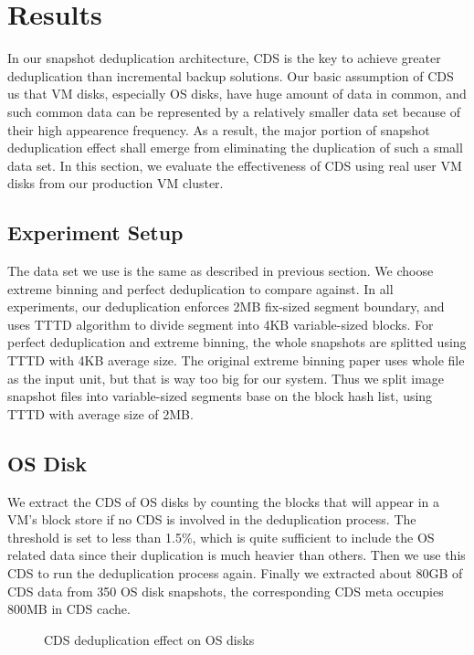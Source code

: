 \section{Results}
In our snapshot deduplication architecture, CDS is the key to achieve greater deduplication than
incremental backup solutions. Our basic assumption of CDS us that VM disks, especially OS disks,
have huge amount of data in common, and such common data can be represented by a relatively smaller data set
because of their high appearence frequency. As a result, the major portion of snapshot deduplication effect shall 
emerge from eliminating the duplication of such a small data set. In this section, we evaluate
the effectiveness of CDS using real user VM disks from our production VM cluster.

\subsection{Experiment Setup}
The data set we use is the same as described in previous section. 
We choose extreme binning and perfect deduplication to compare against.
In all experiments, our deduplication enforces 2MB fix-sized segment boundary, 
and uses TTTD algorithm to divide segment into 4KB variable-sized blocks.
For perfect deduplication and extreme binning, the whole snapshots are splitted
using TTTD with 4KB average size. The original extreme binning paper uses whole file
as the input unit, but that is way too big for our system. 
Thus we split image snapshot files into variable-sized segments base on the block hash list, 
using TTTD with average size of 2MB.

\subsection{OS Disk}
We extract the CDS of OS disks by counting the blocks that will appear in a VM's
block store if no CDS is involved in the deduplication process. The threshold is set to less than
1.5\%, which is quite sufficient to include the OS related data since their duplication is much
heavier than others. Then we use this CDS to run the deduplication process again.
Finally we extracted about 80GB of CDS data from 350 OS disk snapshots,
the corresponding CDS meta occupies 800MB in CDS cache.

\begin{figure}
  \centering
  \caption{CDS deduplication effect on OS disks}
  \label{fig:oscds}
\end{figure}

